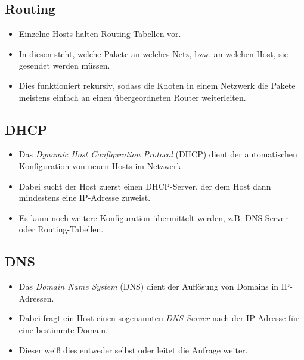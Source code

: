 \documentclass[a4paper, 11pt, accentcolor = tud3b]{tudreport}
\begin{document}
            \subsection{Routing}
                \begin{itemize}
                	\item Einzelne Hosts halten Routing-Tabellen vor.
                	\item In diesen steht, welche Pakete an welches Netz, bzw. an welchen Host, sie gesendet werden müssen.
                	\item Dies funktioniert rekursiv, sodass die Knoten in einem Netzwerk die Pakete meistens einfach an einen übergeordneten Router weiterleiten.
                \end{itemize}

            \subsection{DHCP}
                \begin{itemize}
                	\item Das \textit{Dynamic Host Configuration Protocol} (DHCP) dient der automatischen Konfiguration von neuen Hosts im Netzwerk.
                	\item Dabei sucht der Host zuerst einen DHCP-Server, der dem Host dann mindestens eine IP-Adresse zuweist.
                	\item Es kann noch weitere Konfiguration übermittelt werden, z.B. DNS-Server oder Routing-Tabellen.
                \end{itemize}

            \subsection{DNS}
                \begin{itemize}
                	\item Das \textit{Domain Name System} (DNS) dient der Auflösung von Domains in IP-Adressen.
                	\item Dabei fragt ein Host einen sogenannten \textit{DNS-Server} nach der IP-Adresse für eine bestimmte Domain.
                	\item Dieser weiß dies entweder selbst oder leitet die Anfrage weiter.
                \end{itemize}
\end{document}
